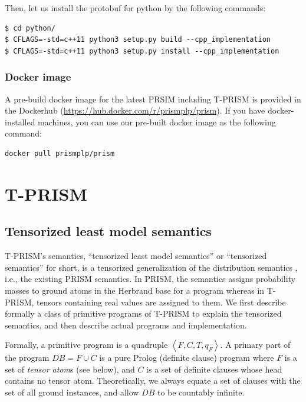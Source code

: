 \documentclass[a4paper]{report}
\newcommand{\db}{\mathit{DB}}
\begin{document}
Then, let us install the protobuf for python by the following commands:
\begin{verbatim}
$ cd python/
$ CFLAGS=-std=c++11 python3 setup.py build --cpp_implementation
$ CFLAGS=-std=c++11 python3 setup.py install --cpp_implementation
\end{verbatim}

\subsection*{Docker image}
A pre-build docker image for the latest PRSIM including T-PRISM is provided in the Dockerhub (\url{https://hub.docker.com/r/prismplp/prism}). 
If you have docker-installed machines, you can use our pre-built docker image  as the following command:

\begin{verbatim}
docker pull prismplp/prism
\end{verbatim}

\chapter{T-PRISM}
\label{chap:tprism_semantics}




\section{Tensorized least model semantics}

T-PRISM's   semantics,  ``tensorized   least   model  semantics''   or
``tensorized semantics'' for short,  is a tensorized generalization of
the  distribution semantics  \cite{Sato95}, i.e.,  the existing  PRISM
semantics.  In  PRISM, the  semantics  assigns  probability masses  to
ground atoms  in the Herbrand base  for a program whereas  in T-PRISM,
tensors containing real values are assigned to them.
We first describe formally a class of primitive programs of T-PRISM to
explain the  tensorized semantics,  and then describe  actual programs
and implementation.

Formally,   a   primitive   program    is   a   quadruple   $\left\langle
F,C,T,q_F\right\rangle$. A primary part of the program $\db=F \cup C $
is a pure Prolog (definite clause) program  where $F$ is a set of {\em
	tensor atom\/}s  (see below),  and $C$  is a  set of  definite clauses
whose head contains no tensor  atom. Theoretically, we always equate a
set of clauses  with the set of all ground  instances, and allow $\db$
to be countably infinite.
\end{document}

